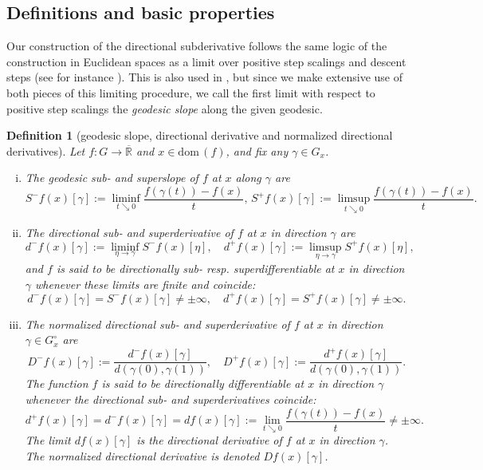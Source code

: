 \documentclass{article}
\theoremstyle{plain}\newtheorem{theorem}{Theorem}[section]
\theoremstyle{plain}\newtheorem{definition}[theorem]{Definition}
\theoremstyle{plain}\newtheorem{lemma}[theorem]{Lemma}
\theoremstyle{definition}\newtheorem{remark}[theorem]{Remark}
\theoremstyle{definition}\newtheorem{example}[theorem]{Example}
\theoremstyle{plain}\newtheorem{proposition}[theorem]{Proposition}
\theoremstyle{plain}\newtheorem{inference}[theorem]{Inference}
\theoremstyle{plain}\newtheorem{corollary}[theorem]{Corollary}
\theoremstyle{plain}\newtheorem{assumption}[theorem]{Assumption}
\begin{document}
\subsection{Definitions and basic properties}\label{s:defs}
Our construction of the directional subderivative  follows the same logic of the construction in Euclidean spaces as a limit over positive step scalings and descent steps (see for instance \cite[Definition 8.1]{VA}). This is also used in \cite[Definition 3.2]{OhtaPal15}, but since we make extensive use of both pieces of this limiting procedure, we call the first limit with respect to positive step scalings the {\em geodesic slope} along the given geodesic.
\begin{definition}[geodesic slope, directional derivative and normalized directional derivatives]\label{de: geod slp/dir devt/norm dir devt}
    Let $f:G\to\overline{\mathbb{R}}$ and $x\in\mathrm{dom}\,(f)$, and fix any $\gamma\in G_x$.
    \begin{enumerate}[(i)]
        \item The {\em geodesic sub- and superslope} of $f$ at $x$ along $\gamma$ are
        $$
        S^-f(x)[\gamma]:=\liminf_{t\searrow 0}\frac{f(\gamma(t))-f(x)}{t}, \, S^+f(x)[\gamma]:=\limsup_{t\searrow 0}\frac{f(\gamma(t))-f(x)}{t}.
        $$
        \item The {\em directional sub- and superderivative} of $f$ at $x$ in direction $\gamma$ are
        $$
        d^-f(x)[\gamma]:=\liminf_{\eta\to\gamma}S^-f(x)[\eta], \quad d^+f(x)[\gamma]:=\limsup_{\eta\to\gamma}S^+f(x)[\eta],
        $$
        and $f$ is said to be {\em directionally sub- resp. superdifferentiable at $x$ in direction $\gamma$} whenever these limits are finite and coincide:
        $$
        d^-f(x)[\gamma]=S^-f(x)[\gamma]\neq\pm\infty, \quad d^+f(x)[\gamma]=S^+f(x)[\gamma]\neq\pm\infty.
        $$
        \item The {\em normalized directional sub- and superderivative} of $f$ at $x$ in direction $\gamma\in G_x^{\circ}$ are
        $$
        D^-f(x)[\gamma]:=\frac{d^-f(x)[\gamma]}{d(\gamma(0), \gamma(1))}, \quad  D^+f(x)[\gamma]:=\frac{d^+f(x)[\gamma]}{d(\gamma(0), \gamma(1))}.
        $$
        The function $f$ is said to be
        {\em directionally differentiable at $x$ in direction $\gamma$} whenever the directional sub- and superderivatives coincide:
        $$
        d^+f(x)[\gamma]=d^-f(x)[\gamma]=df(x)[\gamma]:=\lim_{t\searrow 0}\frac{f(\gamma(t))-f(x)}{t}\neq\pm\infty.
        $$
        The limit $df(x)[\gamma]$ is the {\em directional derivative of $f$ at $x$ in direction $\gamma$}.
        The {\em normalized directional derivative} is denoted $Df(x)[\gamma]$.
    \end{enumerate}
\end{definition}
\end{document}
